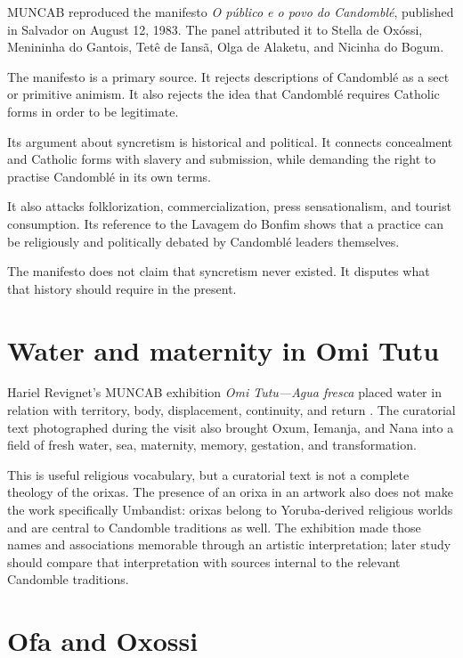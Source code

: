 MUNCAB reproduced the manifesto
\emph{O p\'ublico e o povo do Candombl\'e},
published in Salvador on August 12, 1983.
The panel attributed it to Stella de
Ox\'ossi, Menininha do Gantois, Tet\^e de
Ians\~a, Olga de Alaketu, and Nicinha do
Bogum.

The manifesto is a primary source.  It
rejects descriptions of Candombl\'e as a
sect or primitive animism.  It also rejects
the idea that Candombl\'e requires Catholic
forms in order to be legitimate.

Its argument about syncretism is historical
and political.  It connects concealment
and Catholic forms with slavery and
submission, while demanding the right to
practise Candombl\'e in its own terms.

It also attacks folklorization,
commercialization, press sensationalism,
and tourist consumption.  Its reference to
the Lavagem do Bonfim shows that a practice
can be religiously and politically debated
by Candombl\'e leaders themselves.

The manifesto does not claim that
syncretism never existed.  It disputes what
that history should require in the present.


\section{Water and maternity in Omi Tutu}
\label{section-omi-tutu-religion}

Hariel Revignet's MUNCAB exhibition
\emph{Omi Tutu---Agua fresca} placed
water in relation with territory, body,
displacement, continuity, and return
\cite{muncab2026omitutu}.  The curatorial
text photographed during the visit also
brought Oxum, Iemanja, and Nana into a
field of fresh water, sea, maternity,
memory, gestation, and transformation.

This is useful religious vocabulary, but
a curatorial text is not a complete
theology of the orixas.  The presence of an orixa in an artwork also does not
make the work specifically Umbandist: orixas belong to Yoruba-derived
religious worlds and are central to Candomble traditions as well.  The exhibition
made those names and associations
memorable through an artistic
interpretation; later study should compare
that interpretation with sources internal
to the relevant Candomble traditions.

\section{Ofa and Oxossi}
\label{section-ofa-oxossi}

